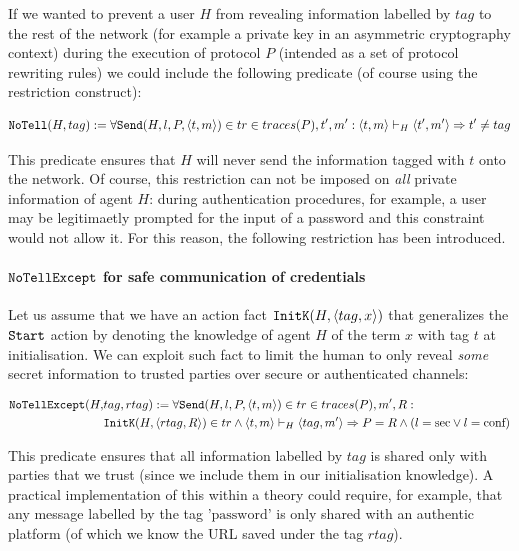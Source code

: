 \documentclass{article}
\newcommand{\mono}[1]{\textrm{\tt #1}}
\begin{document}
If we wanted to prevent a user $H$ from revealing information labelled by $tag$ to the rest of the network (for example a private key in an asymmetric cryptography context) during the execution of protocol $P$ (intended as a set of protocol rewriting rules) we could include the following predicate (of course using the restriction construct):

\begin{equation*}
    \mono{NoTell}(H, tag) := \forall \mono{Send}(H, l, P, \langle t,m \rangle) \in tr \in traces(P), t', m' : \langle t, m \rangle \vdash_H \langle t', m' \rangle \Rightarrow t' \not = tag
\end{equation*}

This predicate ensures that $H$ will never send the information tagged with $t$ onto the network. Of course, this restriction can not be imposed on \textit{all} private information of agent $H$: during authentication procedures, for example, a user may be legitimaetly prompted for the input of a password and this constraint would not allow it. For this reason, the following restriction has been introduced.

\paragraph{$\mono{NoTellExcept}$ for safe communication of credentials}

Let us assume that we have an action fact $\mono{InitK}(H, \langle tag, x \rangle)$ that generalizes the $\mono{Start}$ action by denoting the knowledge of agent $H$ of the term $x$ with tag $t$ at initialisation. We can exploit such fact to limit the human to only reveal \textit{some} secret information to trusted parties over secure or authenticated channels:

\begin{align*}
    \mono{NoTellExcept}(H,&tag,rtag) := \forall \mono{Send}(H,l,P,\langle t,m \rangle) \in tr \in traces(P), m', R : \\
    &\mono{InitK}(H, \langle rtag, R \rangle) \in tr \land \langle t,m \rangle \vdash_H \langle tag, m' \rangle \Rightarrow P = R \land (l=\textrm{sec} \lor l = \textrm{conf})
\end{align*}

This predicate ensures that all information labelled by $tag$ is shared only with parties that we trust (since we include them in our initialisation knowledge). A practical implementation of this within a theory could require, for example, that any message labelled by the tag $\textrm{'password'}$ is only shared with an authentic platform (of which we know the URL saved under the tag $rtag$).
\end{document}
